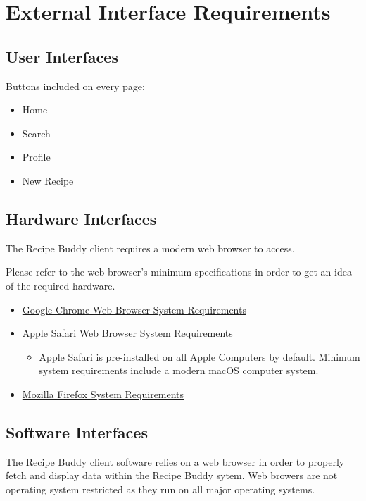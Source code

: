 \documentclass{scrreprt}
\begin{document}
\chapter{External Interface Requirements}

\section{User Interfaces}
Buttons included on every page:
\begin{itemize}
    \item Home
    \item Search
    \item Profile
    \item New Recipe
\end{itemize}

\section{Hardware Interfaces}
The Recipe Buddy client requires a modern web browser to access.

Please refer to the web browser's minimum specifications in order to get an idea of the required hardware.

\begin{itemize}
    \item \href{https://support.google.com/chrome/a/answer/7100626?hl=en}{Google Chrome Web Browser System Requirements}
    \item Apple Safari Web Browser System Requirements
          \begin{itemize}
              \item Apple Safari is pre-installed on all Apple Computers by default. Minimum system requirements include a modern macOS computer system.
          \end{itemize}
    \item \href{https://www.mozilla.org/en-US/firefox/92.0.1/system-requirements/}{Mozilla Firefox System Requirements}
\end{itemize}

\section{Software Interfaces}
The Recipe Buddy client software relies on a web browser in order to properly fetch and display data within the Recipe Buddy sytem. Web browers are not operating system restricted as they run on all major operating systems.
\end{document}
